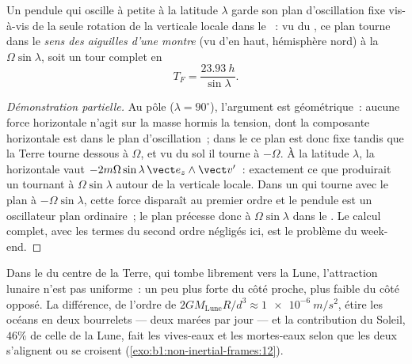 \begin{proposition}\label{prop:b1:non-inertial-frames:foucault}
Un pendule qui oscille à petite  à la latitude $\lambda$ garde
son plan d'oscillation fixe vis-à-vis de la seule rotation de la
verticale locale dans le ~: vu du , ce plan tourne dans le \emph{sens des aiguilles d'une montre}
(vu d'en haut, hémisphère nord) à la 
$\Omega\sin\lambda$, soit un tour complet en
\[
T_F = \frac{\qty{23.93}{h}}{\sin\lambda} .
\]
\end{proposition}

\begin{proof}[Démonstration partielle]
Au pôle ($\lambda = 90^\circ$), l'argument est géométrique~: aucune force
horizontale n'agit sur la masse hormis la tension, dont la composante
horizontale est dans le plan d'oscillation~; dans le  ce plan est donc fixe tandis que la Terre tourne dessous à
$\Omega$, et vu du sol il tourne à $-\Omega$. À la latitude $\lambda$, la
 horizontale vaut
$-2m\Omega\sin\lambda\,\vect e_z\wedge\vect v'$~: exactement ce que
produirait un  tournant à $\Omega\sin\lambda$ autour de la
verticale locale. Dans un  qui tourne avec le plan à
$-\Omega\sin\lambda$, cette force disparaît au premier ordre et le
pendule est un oscillateur plan ordinaire~; le plan précesse donc à
$\Omega\sin\lambda$ dans le . Le calcul complet,
avec les termes du second ordre négligés ici, est le problème du week-end.
\end{proof}

\begin{remark}\label{rem:b1:non-inertial-frames:tides}
Dans le  du centre de la Terre, qui tombe librement vers la
Lune, l'attraction lunaire n'est pas uniforme~: un peu plus forte du côté
proche, plus faible du côté opposé. La différence, de l'ordre de $2GM_{\text{Lune}}R/d^3
\approx \qty{1e-6}{m/s^2}$, étire les océans en deux bourrelets --- deux
marées par jour --- et la contribution du Soleil, $46\%$ de celle de la
Lune, fait les vives-eaux et les mortes-eaux selon que les deux
s'alignent ou se croisent (\cref{exo:b1:non-inertial-frames:12}).
\end{remark}

